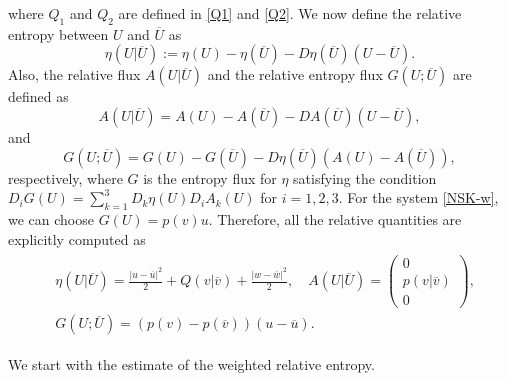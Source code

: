 \documentclass[11pt,reqno]{amsart}
\begin{document}
where $Q_1$ and $Q_2$ are defined in \eqref{Q1} and \eqref{Q2}. We now define the relative entropy between $U$ and $\overline{U}$ as
\[\eta(U|\overline{U}):=\eta(U)-\eta(\overline{U})-D\eta(\overline{U})(U-\overline{U}).\]
Also, the relative flux $A(U|\overline{U})$ and the relative entropy flux $G(U;\overline{U})$ are defined as
\[A(U|\overline{U})=A(U)-A(\overline{U})-DA(\overline{U})(U-\overline{U}),\]
and 
\[G(U;\overline{U})=G(U)-G(\overline{U})-D\eta(\overline{U})(A(U)-A(\overline{U})),\]
respectively, where $G$ is the entropy flux for $\eta$ satisfying the condition $D_iG(U)=\sum_{k=1}^3 D_k \eta(U)D_iA_k(U)$ for $i=1,2,3$. For the system \eqref{NSK-w}, we can choose $G(U)=p(v)u$. Therefore, all the relative quantities are explicitly computed as
\begin{align}
\begin{aligned}\label{relative_functional}
&\eta(U|\overline{U})=
\frac{|u-\overline{u}|^2}{2}+Q(v|\overline{v})+\frac{|w-\overline{w}|^2}{2},\quad
A(U|\overline{U})=\begin{pmatrix}
0\\
p(v|\overline{v})\\
0
\end{pmatrix},\\
&G(U;\overline{U})=(p(v)-p(\overline{v}))(u-\overline{u}).
\end{aligned}
\end{align}

We start with the estimate of the weighted relative entropy.
\end{document}

